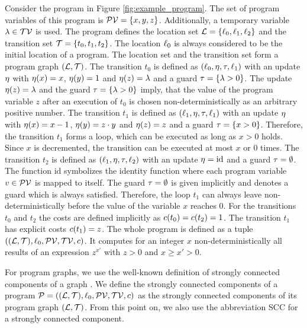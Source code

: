 \begin{example}[Program]
  
  Consider the program in Figure \ref{fig:example_program}.
  The set of program variables of this program is $\mathcal{PV} = \lbrace x,y,z \rbrace$.
  Additionally, a temporary variable $\lambda \in \mathcal{TV}$ is used.
  The program defines the location set $\mathcal{L} = \lbrace \ell_0,\ell_1,\ell_2 \rbrace$ and the transition set $\mathcal{T} = \lbrace t_0,t_1,t_2 \rbrace$.
  The location $\ell_0$ is always considered to be the initial location of a program.
  The location set and the transition set form a program graph $(\mathcal{L}, \mathcal{T})$.
  The transition $t_0$ is defined as $(\ell_0,\eta,\tau,\ell_1)$ with an update $\eta$ with $\eta(x)=x$, $\eta(y)=1$ and $\eta(z)=\lambda$ and a guard $\tau = \lbrace \lambda > 0 \rbrace$.
  The update $\eta(z)=\lambda$ and the guard $\tau = \lbrace \lambda > 0 \rbrace$ imply, that the value of the program variable $z$ after an execution of $t_0$ is chosen non-deterministically as an arbitrary positive number.
  The transition $t_1$ is defined as $(\ell_1,\eta,\tau,\ell_1)$ with an update $\eta$ with $\eta(x)=x-1$, $\eta(y)=z \cdot y$ and $\eta(z)=z$ and a guard $\tau = \lbrace x > 0 \rbrace$.
  Therefore, the transition $t_1$ forms a loop, which can be executed as long as $x > 0$ holds.
  Since $x$ is decremented, the transition can be executed at most $x$ or $0$ times.
  The transition $t_2$ is defined as $(\ell_1,\eta,\tau,\ell_2)$ with an update $\eta = \text{id}$ and a guard $\tau = \emptyset$.
  The function $\text{id}$ symbolizes the identity function where each program variable $v \in \mathcal{PV}$ is mapped to itself.
  The guard $\tau = \emptyset$ is given implicitly and denotes a guard which is always satisfied.
  Therefore, the loop $t_1$ can always leave non-deterministically before the value of the variable $x$ reaches $0$.
  For the transitions $t_0$ and $t_2$ the costs are defined implicitly as $c(t_0) = c(t_2) = 1$.
  The transition $t_1$ has explicit costs $c(t_1) = z$.
  The whole program is defined as a tuple $((\mathcal{L}, \mathcal{T}), \ell_0, \mathcal{PV}, \mathcal{TV}, c)$.
  It computes for an integer $x$ non-deterministically all results of an expression $z^{x'}$ with $z > 0$ and $x \geq x' > 0$.  
\end{example}

For program graphs, we use the well-known definition of strongly connected components of a graph \cite{sccs}.
We define the strongly connected components of a program $\mathcal{P} = ((\mathcal{L}, \mathcal{T}), \ell_0, \mathcal{PV}, \mathcal{TV}, c)$ as the strongly connected components of its program graph $(\mathcal{L}, \mathcal{T})$.
From this point on, we also use the abbreviation SCC for a strongly connected component.

